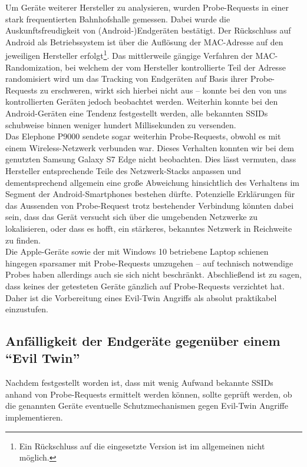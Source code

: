 Um Geräte weiterer Hersteller zu analysieren, wurden Probe-Requests in einer stark frequentierten Bahnhofshalle gemessen. Dabei wurde die Auskunftsfreudigkeit von (Android-)Endgeräten bestätigt. Der Rückschluss auf Android als Betriebssystem ist über die Auflösung der MAC-Adresse auf den jeweiligen Hersteller erfolgt\footnote{Ein Rückschluss auf die eingesetzte Version ist im allgemeinen nicht möglich.}.
Das mittlerweile gängige Verfahren der MAC-Randomization, bei welchem der vom Hersteller kontrollierte Teil der Adresse randomisiert wird um das Tracking von Endgeräten auf Basis ihrer Probe-Requests zu erschweren, wirkt sich hierbei nicht aus -- konnte bei den von uns kontrollierten Geräten jedoch beobachtet werden.
Weiterhin konnte bei den Android-Geräten eine Tendenz festgestellt werden, alle bekannten SSIDs schubweise binnen weniger hundert Millisekunden zu versenden.\\

Das Elephone P9000 sendete sogar weiterhin Probe-Requests, obwohl es mit einem Wireless-Netzwerk verbunden war. Dieses Verhalten konnten wir bei dem genutzten Samsung Galaxy S7 Edge nicht beobachten. Dies lässt vermuten, dass Hersteller entsprechende Teile des Netzwerk-Stacks anpassen und dementsprechend allgemein eine große Abweichung hinsichtlich des Verhaltens im Segment der Android-Smartphones bestehen dürfte.
Potenzielle Erklärungen für das Aussenden von Probe-Request trotz bestehender Verbindung könnten dabei sein, dass das Gerät versucht sich über die umgebenden Netzwerke zu lokalisieren, oder dass es hofft, ein stärkeres, bekanntes Netzwerk in Reichweite zu finden.\\

Die Apple-Geräte sowie der mit Windows 10 betriebene Laptop schienen hingegen sparsamer mit Probe-Requests umzugehen -- auf technisch notwendige Probes haben allerdings auch sie sich nicht beschränkt.
Abschließend ist zu sagen, dass keines der getesteten Geräte gänzlich auf Probe-Requests verzichtet hat.
Daher ist die Vorbereitung eines Evil-Twin Angriffs als absolut praktikabel einzustufen.

\subsection{Anfälligkeit der Endgeräte gegenüber einem \enquote{Evil Twin}}
Nachdem festgestellt worden ist, dass mit wenig Aufwand bekannte SSIDs anhand von Probe-Requests ermittelt werden können, sollte geprüft werden, ob die genannten Geräte eventuelle Schutzmechanismen gegen Evil-Twin Angriffe implementieren.\\

